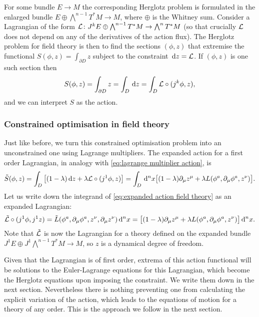 \documentclass[../main.tex]{subfiles}
\begin{document}
For some bundle \(E \to M\) the corresponding Herglotz problem is formulated in the enlarged bundle \(E \oplus \bigwedge^{n-1}T^\ast M \to M \), where \(\oplus\) is the Whitney sum. Consider a Lagrangian of the form \(\mathcal{L} \colon J^kE \oplus \bigwedge^{n-1}T^\ast M \to \bigwedge^n T^\ast M \) (so that crucially \(\mathcal{L}\) does not depend on any of the derivatives of the action flux). The Herglotz problem for field theory is then to find the sections \((\phi,z)\) that extremise the functional \(S(\phi,z) = \int_{\partial  D} z\) subject to the constraint \(\,\mathrm{d} z = \mathcal{L}\). If \((\phi, z)\) is one such section then
\begin{equation*}
	S(\phi,z) = \int_{\partial D} z = \int_D \,\mathrm{d} z = \int_D  \mathcal{L} \circ (j^k \phi, z),
\end{equation*}
and we can interpret \(S\) as the action. 

\subsubsection{Constrained optimisation in field theory}
Just like before, we turn this constrained optimisation problem into an
unconstrained one using Lagrange multipliers. The expanded action for a first order Lagrangian, in analogy with
\cref{eq:lagrange multiplier action}, is
\begin{equation}\label{eq:expanded action field theory}
	\tilde{S}(\phi, z) = \int_D \big[(1 - \lambda) \,\mathrm{d} z + \lambda \mathcal{L} \circ (j^1\phi,z)\big]
	= \int_D \,\mathrm{d}^n x \big[ (1 - \lambda) \partial_\mu z^\mu + \lambda L(\phi^a,
	\partial_\mu \phi^a, z^\nu) \big].
\end{equation}
Let us write down the integrand of
\cref{eq:expanded action field theory} as an expanded Lagrangian:
\begin{equation} \label{eq:expanded lagrangian field theory}
	\tilde{\mathcal{L}}\circ(j^1\phi, j^1 z) = \tilde{L}(\phi^a, \partial_\mu \phi^a, z^\nu, \partial_\mu z^\nu)\,\mathrm{d}^n x = \big[ (1 - \lambda)
	\partial_\mu z^\mu + \lambda L(\phi^a, \partial_\mu \phi^a, z^\nu) \big] \,\mathrm{d}^n x.
\end{equation}
Note that \( \Tilde{\mathcal{L}} \) is now the Lagrangian for a theory defined on the expanded bundle \(J^1E \oplus J^1\bigwedge^{n-1}T^\ast M \to M\), so \( z\) is a dynamical degree of freedom. 

Given that the Lagrangian is of first order, extrema of this action functional will be
solutions to the Euler-Lagrange equations for this Lagrangian, which become the Herglotz
equations upon imposing the constraint. We write them down in the next section.
Nevertheless there is nothing preventing one from calculating the explicit variation of
the action, which leads to the equations of motion for a theory of any order. This is the
approach we follow in the next section.
\end{document}
